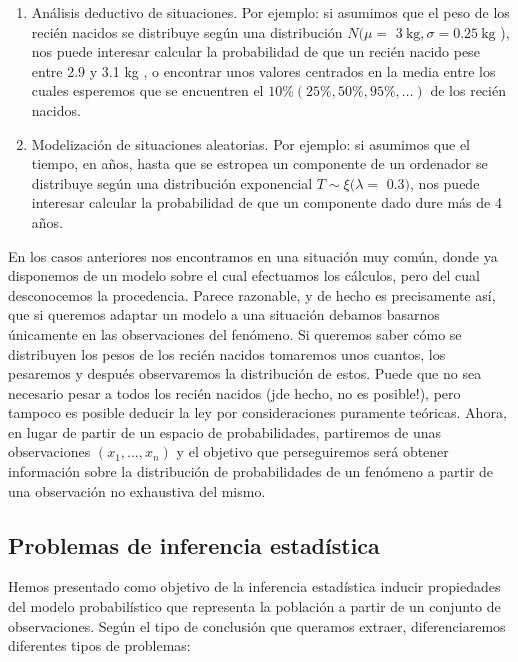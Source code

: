 \documentclass[
]{article}
\providecommand{\tightlist}{%
  \setlength{\itemsep}{0pt}\setlength{\parskip}{0pt}}
\begin{document}
\begin{enumerate}
\def\labelenumi{\arabic{enumi}.}
\tightlist
\item
  Análisis deductivo de situaciones. Por ejemplo: si asumimos que el peso de los recién nacidos se distribuye según una distribución \(N(\mu=\) \(3 \mathrm{~kg}, \sigma=0.25 \mathrm{~kg}\) ), nos puede interesar calcular la probabilidad de que un recién nacido pese entre 2.9 y 3.1 kg , o encontrar unos valores centrados en la media entre los cuales esperemos que se encuentren el \(10 \%(25 \%, 50 \%, 95 \%, \ldots)\) de los recién nacidos.
\item
  Modelización de situaciones aleatorias. Por ejemplo: si asumimos que el tiempo, en años, hasta que se estropea un componente de un ordenador se distribuye según una distribución exponencial \(T \sim \xi(\lambda=\) \(0.3)\), nos puede interesar calcular la probabilidad de que un componente dado dure más de 4 años.
\end{enumerate}

En los casos anteriores nos encontramos en una situación muy común, donde ya disponemos de un modelo sobre el cual efectuamos los cálculos, pero del cual desconocemos la procedencia. Parece razonable, y de hecho es precisamente así, que si queremos adaptar un modelo a una situación debamos basarnos únicamente en las observaciones del fenómeno.
Si queremos saber cómo se distribuyen los pesos de los recién nacidos tomaremos unos cuantos, los pesaremos y después observaremos la distribución de estos. Puede que no sea necesario pesar a todos los recién nacidos (jde hecho, no es posible!), pero tampoco es posible deducir la ley por consideraciones puramente teóricas.
Ahora, en lugar de partir de un espacio de probabilidades, partiremos de unas observaciones \(\left(x_{1}, \ldots, x_{n}\right)\) y el objetivo que perseguiremos será obtener información sobre la distribución de probabilidades de un fenómeno a partir de una observación no exhaustiva del mismo.

\subsection{Problemas de inferencia estadística}\label{problemas-de-inferencia-estaduxedstica}

Hemos presentado como objetivo de la inferencia estadística inducir propiedades del modelo probabilístico que representa la población a partir de un conjunto de observaciones.
Según el tipo de conclusión que queramos extraer, diferenciaremos diferentes tipos de problemas:
\end{document}
